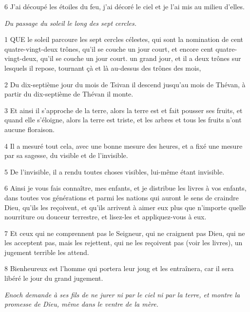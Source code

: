 \par 6 J'ai découpé les étoiles du feu, j'ai décoré le ciel et je l'ai mis au milieu d'elles.


\par \textit{Du passage du soleil le long des sept cercles.}

\par 1 QUE le soleil parcoure les sept cercles célestes, qui sont la nomination de cent quatre-vingt-deux trônes, qu'il se couche un jour court, et encore cent quatre-vingt-deux, qu'il se couche un jour court. un grand jour, et il a deux trônes sur lesquels il repose, tournant çà et là au-dessus des trônes des mois,

\par 2 Du dix-septième jour du mois de Tsivan il descend jusqu'au mois de Thévan, à partir du dix-septième de Thévan il monte.

\par 3 Et ainsi il s'approche de la terre, alors la terre est et fait pousser ses fruits, et quand elle s'éloigne, alors la terre est triste, et les arbres et tous les fruits n'ont aucune floraison.

\par 4 Il a mesuré tout cela, avec une bonne mesure des heures, et a fixé une mesure par sa sagesse, du visible et de l'invisible.

\par 5 De l'invisible, il a rendu toutes choses visibles, lui-même étant invisible.

\par 6 Ainsi je vous fais connaître, mes enfants, et je distribue les livres à vos enfants, dans toutes vos générations et parmi les nations qui auront le sens de craindre Dieu, qu'ils les reçoivent, et qu'ils arrivent à aimer eux plus que n'importe quelle nourriture ou douceur terrestre, et lisez-les et appliquez-vous à eux.

\par 7 Et ceux qui ne comprennent pas le Seigneur, qui ne craignent pas Dieu, qui ne les acceptent pas, mais les rejettent, qui ne les reçoivent pas (voir les livres), un jugement terrible les attend.

\par 8 Bienheureux est l'homme qui portera leur joug et les entraînera, car il sera libéré le jour du grand jugement.


\par \textit{Enoch demande à ses fils de ne jurer ni par le ciel ni par la terre, et montre la promesse de Dieu, même dans le ventre de la mère.}

